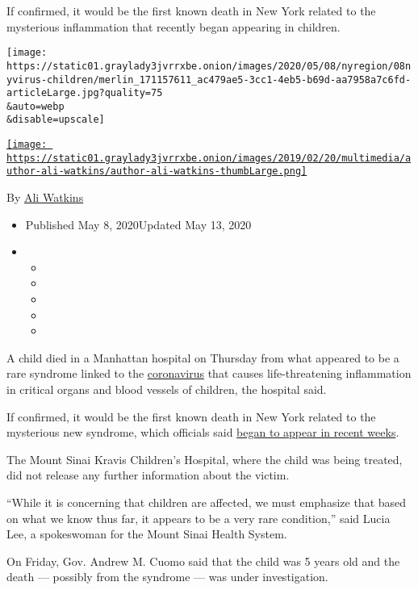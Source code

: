 If confirmed, it would be the first known death in New York related to
the mysterious inflammation that recently began appearing in children.

\texttt{[image: https://static01.graylady3jvrrxbe.onion/images/2020/05/08/nyregion/08nyvirus-children/merlin\_171157611\_ac479ae5-3cc1-4eb5-b69d-aa7958a7c6fd-articleLarge.jpg?quality=75\\\&auto=webp\\\&disable=upscale]}

\href{https://www.nytimes3xbfgragh.onion/by/ali-watkins}{\texttt{[image: https://static01.graylady3jvrrxbe.onion/images/2019/02/20/multimedia/author-ali-watkins/author-ali-watkins-thumbLarge.png]}}

By \href{https://www.nytimes3xbfgragh.onion/by/ali-watkins}{Ali Watkins}

\begin{itemize}
\item
  Published May 8, 2020Updated May 13, 2020
\item
  \begin{itemize}
  \item
  \item
  \item
  \item
  \item
  \end{itemize}
\end{itemize}

A child died in a Manhattan hospital on Thursday from what appeared to
be a rare syndrome linked to the
\href{https://www.nytimes3xbfgragh.onion/2020/05/13/health/coronavirus-children-kawasaki-pmis.html}{coronavirus}
that causes life-threatening inflammation in critical organs and blood
vessels of children, the hospital said.

If confirmed, it would be the first known death in New York related to
the mysterious new syndrome, which officials said
\href{https://www.nytimes3xbfgragh.onion/2020/05/05/nyregion/kawasaki-disease-coronavirus.html}{began
to appear in recent weeks}.

The Mount Sinai Kravis Children's Hospital, where the child was being
treated, did not release any further information about the victim.

``While it is concerning that children are affected, we must emphasize
that based on what we know thus far, it appears to be a very rare
condition,'' said Lucia Lee, a spokeswoman for the Mount Sinai Health
System.

On Friday, Gov. Andrew M. Cuomo said that the child was 5 years old and
the death --- possibly from the syndrome --- was under investigation.

